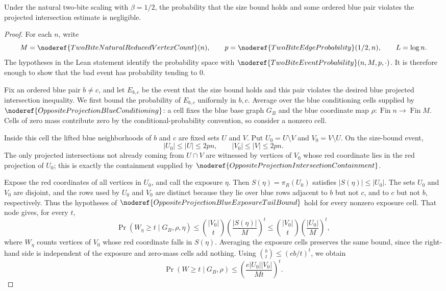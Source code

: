 \begin{helper}
Under the natural two-bite scaling with \(\beta=1/2\), the probability that
the size bound holds and some ordered blue pair violates the projected
intersection estimate is negligible.
\end{helper}
\begin{proof}
For each \(n\), write
\[
M=\noderef{TwoBiteNaturalReducedVertexCount}(n),\qquad
p=\noderef{TwoBiteEdgeProbability}(1/2,n),\qquad L=\log n .
\]
The hypotheses in the Lean statement identify the probability space with
\(\noderef{TwoBiteEventProbability}(n,M,p,\cdot)\).  It is therefore enough
to show that the bad event has probability tending to \(0\).

Fix an ordered blue pair \(b\ne c\), and let \(E_{b,c}\) be the event that
the size bound holds and this pair violates the desired blue projected
intersection inequality.  We first bound the probability of \(E_{b,c}\)
uniformly in \(b,c\).  Average over the blue conditioning cells supplied by
\(\noderef{OppositeProjectionBlueConditioning}\): a cell fixes the blue base
graph \(G_B\) and the blue coordinate map \(\rho:\operatorname{Fin} n\to
\operatorname{Fin} M\).  Cells of zero mass contribute zero by the
conditional-probability convention, so consider a nonzero cell.

Inside this cell the lifted blue neighborhoods of \(b\) and \(c\) are fixed
sets \(U\) and \(V\).  Put \(U_0=U\setminus V\) and \(V_0=V\setminus U\).
On the size-bound event,
\[
|U_0|\le |U|\le 2pn,\qquad |V_0|\le |V|\le 2pn .
\]
The only projected intersections not already coming from \(U\cap V\) are
witnessed by vertices of \(V_0\) whose red coordinate lies in the red
projection of \(U_0\); this is exactly the containment supplied by
\(\noderef{OppositeProjectionIntersectionContainment}\).

Expose the red coordinates of all vertices in \(U_0\), and call the exposure
\(\eta\).  Then \(S(\eta)=\pi_R(U_0)\) satisfies
\(|S(\eta)|\le |U_0|\).  The sets \(U_0\) and \(V_0\) are disjoint, and the
rows used by \(U_0\) and \(V_0\) are distinct because they lie over blue rows
adjacent to \(b\) but not \(c\), and to \(c\) but not \(b\), respectively.
Thus the hypotheses of
\(\noderef{OppositeProjectionBlueExposureTailBound}\) hold for every
nonzero exposure cell.  That node gives, for every \(t\),
\[
\Pr(W_\eta\ge t\mid G_B,\rho,\eta)
\le \binom{|V_0|}{t}\left(\frac{|S(\eta)|}{M}\right)^t
\le \binom{|V_0|}{t}\left(\frac{|U_0|}{M}\right)^t ,
\]
where \(W_\eta\) counts vertices of \(V_0\) whose red coordinate falls in
\(S(\eta)\).  Averaging the exposure cells preserves the same bound, since
the right-hand side is independent of the exposure and zero-mass cells add
nothing.  Using \(\binom bt\le(eb/t)^t\), we obtain
\[
\Pr(W\ge t\mid G_B,\rho)
\le \left(\frac{e|U_0||V_0|}{Mt}\right)^t .
\]


\end{proof}
